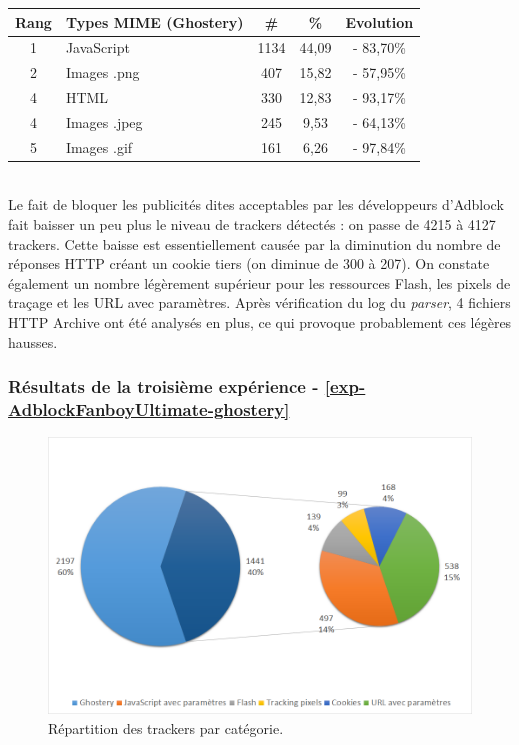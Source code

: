 \begin{tabular}{ c | p{5cm} | c | c | c | }
   Rang & Types MIME (Ghostery) & \# & \% & Evolution\\
   \hline
   \hline
   1 & JavaScript & 1134 & 44,09 & - 83,70\% \\
   2 & Images .png & 407 & 15,82 & - 57,95\% \\
   4 & HTML & 330 & 12,83 & - 93,17\% \\
   4 & Images .jpeg & 245 & 9,53 & - 64,13\% \\
   5 & Images .gif & 161 & 6,26 & - 97,84\% \\
   \hline
\end{tabular}
\\[.3cm]

Le fait de bloquer les publicités dites acceptables par les développeurs d'Adblock fait baisser un peu plus le niveau de trackers détectés : on passe de 4215 à 4127 trackers. Cette baisse est essentiellement causée par la diminution du nombre de réponses HTTP créant un cookie tiers (on diminue de 300 à 207). On constate également un nombre légèrement supérieur pour les ressources Flash, les pixels de traçage et les URL avec paramètres. Après vérification du log du \textit{parser}, 4 fichiers HTTP Archive ont été analysés en plus, ce qui provoque probablement ces légères hausses.

\subsubsection{Résultats de la troisième expérience - \autoref{exp-AdblockFanboyUltimate-ghostery}}
\begin{figure}[!h]
	\centering
	\includegraphics[scale=.6]{resultats/ANALYSES/Images/AdblockFanboyUltimate-Ghostery.png}
	\caption{\label{exp-AdblockFanboyUltimate-ghostery}Répartition des trackers par catégorie.}
\end{figure}

